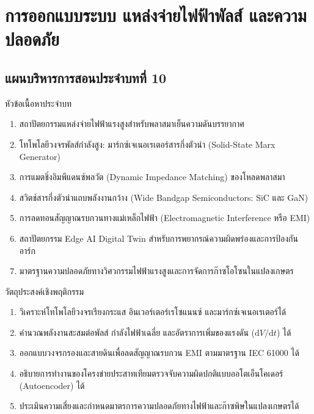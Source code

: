 \chapter{การออกแบบระบบ แหล่งจ่ายไฟฟ้าพัลส์ และความปลอดภัย}
\label{chap:ch10}


\vspace*{-6pt}
\section*{แผนบริหารการสอนประจำบทที่ 10}

\begin{planbox}{หัวข้อเนื้อหาประจำบท}
\begin{enumerate}
    \item สถาปัตยกรรมแหล่งจ่ายไฟฟ้าแรงสูงสำหรับพลาสมาเย็นความดันบรรยากาศ
    \item โทโพโลยีวงจรพัลส์กำลังสูง: มาร์กซ์เจเนอเรเตอร์สารกึ่งตัวนำ (Solid-State Marx Generator)
    \item การแมตชิ่งอิมพีแดนซ์พลวัต (Dynamic Impedance Matching) ของโหลดพลาสมา
    \item สวิตช์สารกึ่งตัวนำแถบพลังงานกว้าง (Wide Bandgap Semiconductors: SiC และ GaN)
    \item การลดทอนสัญญาณรบกวนทางแม่เหล็กไฟฟ้า (Electromagnetic Interference หรือ EMI)
    \item สถาปัตยกรรม Edge AI Digital Twin สำหรับการพยากรณ์ความผิดพร่องและการป้องกันอาร์ก
    \item มาตรฐานความปลอดภัยทางวิศวกรรมไฟฟ้าแรงสูงและการจัดการก๊าซโอโซนในแปลงเกษตร
\end{enumerate}
\end{planbox}

\begin{planbox}{วัตถุประสงค์เชิงพฤติกรรม}
\begin{enumerate}
    \item วิเคราะห์โทโพโลยีวงจรเรียงกระแส อินเวอร์เตอร์เรโซแนนซ์ และมาร์กซ์เจเนอเรเตอร์ได้
    \item คำนวณพลังงานสะสมต่อพัลส์ กำลังไฟฟ้าเฉลี่ย และอัตราการเพิ่มของแรงดัน ($\text{d}V/\text{d}t$) ได้
    \item ออกแบบวงจรกรองและสายดินเพื่อลดสัญญาณรบกวน EMI ตามมาตรฐาน IEC 61000 ได้
    \item อธิบายการทำงานของโครงข่ายประสาทเทียมตรวจจับความผิดปกติแบบออโตเอ็นโคเดอร์ (Autoencoder) ได้
    \item ประเมินความเสี่ยงและกำหนดมาตรการความปลอดภัยทางไฟฟ้าและก๊าซพิษในแปลงเกษตรได้
\end{enumerate}
\end{planbox}

